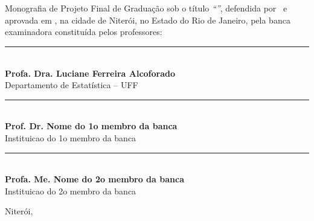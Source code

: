 \documentclass[12pt,a4paper,header]{abnt}
\begin{document}
\begin{folhadeaprovacao}

\thispagestyle{logouff}

\hspace{.2\textwidth} %
\begin{minipage}{.7\textwidth}

\begin{flushright}

{\large \bf \ABNTautordata}\\[1cm]

{\large \bf \ABNTtitulodata}\\[1cm]

\end{flushright}

Monografia de Projeto Final de Graduação sob o título \textit{``\ABNTtitulodata''},
defendida por \ABNTautordata~e aprovada em \ABNTdatadata, na cidade de Niterói,
no Estado do Rio de Janeiro, pela banca examinadora constituída pelos
professores:

\begin{flushright}

\begin{espacosimples}






\vspace{2cm}
\noindent\rule{8cm}{0.4pt}\\
{\bf Profa. Dra. Luciane Ferreira Alcoforado}\\
Departamento de Estatística -- UFF\\


\vspace{2cm}
\noindent\rule{8cm}{0.4pt}\\
{\bf Prof. Dr. Nome do 1o membro da banca}\\
Instituicao do 1o membro da banca\\


\vspace{2cm}
\noindent\rule{8cm}{0.4pt}\\
{\bf Profa. Me. Nome do 2o membro da banca}\\
Instituicao do 2o membro da banca\\

\end{espacosimples}

\end{flushright}

\vspace{2cm}
\hfill Niterói, \ABNTdatadata

\end{minipage}




\end{folhadeaprovacao}
\end{document}
